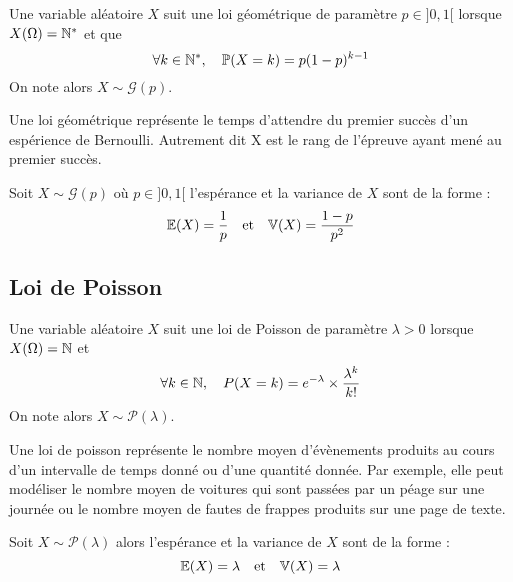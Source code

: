 \begin{definition}
    Une variable aléatoire $X$ suit une loi géométrique de paramètre $p \in ]0,1[$ lorsque $X(\Omega) = \mathbb{N}^*$ et que 
        \[ \forall k \in \mathbb{N}^*, \quad \mathbb{P}(X = k) = p(1-p)^{k-1}  \] 
    On note alors $X \sim \mathcal{G}(p)$. 
\end{definition}

Une loi géométrique représente le temps d'attendre du premier succès d'un espérience de Bernoulli. 
Autrement dit X est le rang de l'épreuve ayant mené au premier succès. 

\begin{proposition}
    Soit $X \sim \mathcal{G}(p)$ où $p \in ]0,1[$ l'espérance et la variance de $X$ sont de la forme :
        \[ \mathbb{E}(X) = \frac{1}{p} \quad \text{et} \quad \mathbb{V}(X) = \frac{1-p}{p^2} \] 
\end{proposition}

\subsection{Loi de Poisson}

\begin{definition}
    Une variable aléatoire $X$ suit une loi de Poisson de paramètre $\lambda > 0$ lorsque $X(\Omega) = \mathbb{N}$ et 
        \[ \forall k \in \mathbb{N}, \quad P(X = k) = e^{- \lambda} \times \frac{\lambda^k}{k!} \]  
    On note alors $ X \sim \mathcal{P}(\lambda)$. 
\end{definition}

Une loi de poisson représente le nombre moyen d'évènements produits au cours d'un intervalle de temps donné ou d'une quantité 
donnée. Par exemple, elle peut modéliser le nombre moyen de voitures qui sont passées par un péage sur une journée ou le nombre 
moyen de fautes de frappes produits sur une page de texte. 

\begin{proposition}
    Soit $ X \sim \mathcal{P}(\lambda)$ alors l'espérance et la variance de $X$ sont de la forme :
        \[ \mathbb{E}(X) = \lambda \quad \text{et} \quad \mathbb{V}(X) = \lambda  \] 
\end{proposition}

